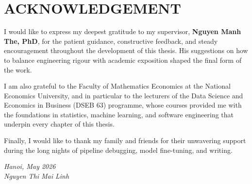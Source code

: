 \chapter*{ACKNOWLEDGEMENT}

I would like to express my deepest gratitude to my supervisor,
\textbf{Nguyen Manh The, PhD}, for the patient guidance, constructive
feedback, and steady encouragement throughout the development of this
thesis. His suggestions on how to balance engineering rigour with
academic exposition shaped the final form of the work.

I am also grateful to the Faculty of Mathematics Economics at the
National Economics University, and in particular to the lecturers of the
Data Science and Economics in Business (DSEB 63) programme, whose
courses provided me with the foundations in statistics, machine learning,
and software engineering that underpin every chapter of this thesis.

Finally, I would like to thank my family and friends for their unwavering
support during the long nights of pipeline debugging, model fine-tuning,
and writing.

\vspace{1cm}
\begin{flushright}
  \textit{Hanoi, May 2026}\\
  \textit{Nguyen Thi Mai Linh}
\end{flushright}
